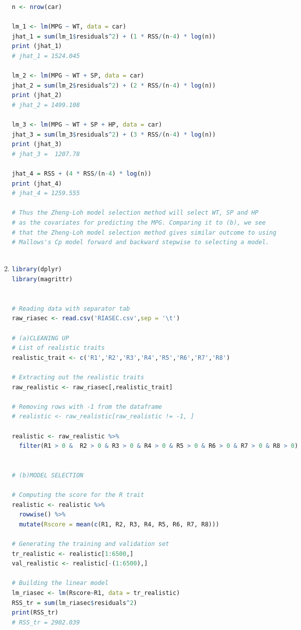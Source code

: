 \documentclass[a4paper,10pt]{article}
\theoremstyle{definition}
\begin{document}
\begin{enumerate}
\begin{lstlisting}[language=R,commentstyle=\fontseries{lc}\color{gray}]
n <- nrow(car)

lm_1 <- lm(MPG ~ WT, data = car)
jhat_1 = sum(lm_1$residuals^2) + (1 * RSS/(n-4) * log(n))
print (jhat_1)
# jhat_1 = 1524.045

lm_2 <- lm(MPG ~ WT + SP, data = car)
jhat_2 = sum(lm_2$residuals^2) + (2 * RSS/(n-4) * log(n))
print (jhat_2)
# jhat_2 = 1499.108

lm_3 <- lm(MPG ~ WT + SP + HP, data = car)
jhat_3 = sum(lm_3$residuals^2) + (3 * RSS/(n-4) * log(n)) 
print (jhat_3)
# jhat_3 =  1207.78

jhat_4 = RSS + (4 * RSS/(n-4) * log(n)) 
print (jhat_4)
# jhat_4 = 1259.555

# Thus the Zheng-Loh model selection method will select WT, SP and HP 
# as the covariates for predicting the MPG. Comparing it to (b), we see
# that the Zheng-Loh model selection method gives similar outcome to using
# Mallows's Cp model forward and backward stepwise to selecting a model.



\end{lstlisting}
\newpage

\item
\begin{lstlisting}[language=R,commentstyle=\fontseries{lc}\color{gray}]
library(dplyr)
library(magrittr)


# Reading data with separator tab
raw_riasec <- read.csv('RIASEC.csv',sep = '\t')

# (a)CLEANING UP
# List of realistic traits
realistic_trait <- c('R1','R2','R3','R4','R5','R6','R7','R8')

# Extracting out the realistic traits
raw_realistic <- raw_riasec[,realistic_trait]

# Removing rows with -1 from the dataframe
# realistic <- raw_realistic[raw_realistic != -1, ]

realistic <- raw_realistic %>%
  filter(R1 > 0 &  R2 > 0 & R3 > 0 & R4 > 0 & R5 > 0 & R6 > 0 & R7 > 0 & R8 > 0)
  

# (b)MODEL SELECTION

# Computing the score for the R trait
realistic <- realistic %>%
  rowwise() %>%
  mutate(Rscore = mean(c(R1, R2, R3, R4, R5, R6, R7, R8))) 

# Generating the training and validation set 
tr_realistic <- realistic[1:6500,]
val_realistic <- realistic[-(1:6500),]

# Building the linear model
lm_riasec <- lm(Rscore~R1, data = tr_realistic)
RSS_tr = sum(lm_riasec$residuals^2)
print(RSS_tr)
# RSS_tr = 2902.039


\end{lstlisting}
\end{enumerate}
\end{document}
